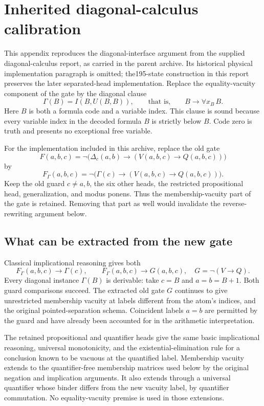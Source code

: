 \section{Inherited diagonal-calculus calibration}\label{sec:diagonal}
This appendix reproduces the diagonal-interface argument from the supplied
diagonal-calculus report, as carried in the parent archive. Its historical
physical implementation paragraph is omitted; the195-state construction in
this report preserves the later separated-head implementation. Replace the equality-vacuity component of the gate by the diagonal clause
\begin{equation}\label{eq:gamma}
 \Gamma(B)=I(B,U(B,B)),\qquad\text{that is,}\qquad B\longrightarrow\forall x_B\,B.
\end{equation}
Here \(B\) is both a formula code and a variable index. This clause is sound because every variable index in the decoded formula \(B\) is strictly below \(B\). Code zero is truth and presents no exceptional free variable.

For the implementation included in this archive, replace the old gate
\[
 F(a,b,c)=\neg\bigl(\Delta_c(a,b)\to(V(a,b,c)\to Q(a,b,c))\bigr)
\]
by
\begin{equation}\label{eq:new-gate}
 F_\Gamma(a,b,c)=\neg\bigl(\Gamma(c)\to(V(a,b,c)\to Q(a,b,c))\bigr).
\end{equation}
Keep the old guard \(c\ne a,b\), the six other heads, the restricted propositional head, generalization, and modus ponens. Thus the membership-vacuity part of the gate is retained. Removing that part as well would invalidate the reverse-rewriting argument below.

\subsection{What can be extracted from the new gate}
Classical implicational reasoning gives both
\[
 F_\Gamma(a,b,c)\to\Gamma(c),\qquad
 F_\Gamma(a,b,c)\to G(a,b,c),
 \quad G=\neg(V\to Q).
\]
Every diagonal instance \(\Gamma(B)\) is derivable: take \(c=B\) and \(a=b=B+1\). Both guard comparisons succeed. The extracted old gate \(G\) continues to give unrestricted membership vacuity at labels different from the atom's indices, and the original pointed-separation schema. Coincident labels \(a=b\) are permitted by the guard and have already been accounted for in the arithmetic interpretation.

The retained propositional and quantifier heads give the same basic implicational reasoning, universal monotonicity, and the existential-elimination rule for a conclusion known to be vacuous at the quantified label. Membership vacuity extends to the quantifier-free membership matrices used below by the original negation and implication arguments. It also extends through a universal quantifier whose binder differs from the new vacuity label, by quantifier commutation. No equality-vacuity premise is used in those extensions.

